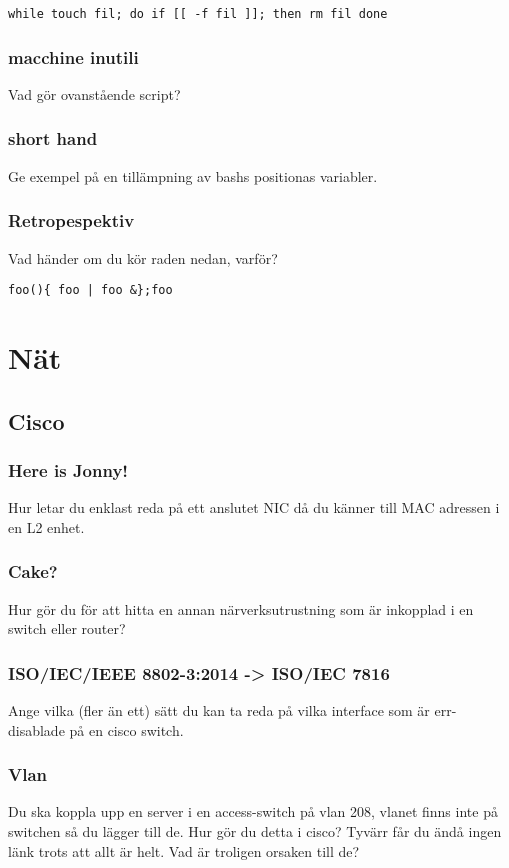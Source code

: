 \documentclass[a4paper]{report}
\begin{document}
\begin{verbatim}
while touch fil; do if [[ -f fil ]]; then rm fil done
\end{verbatim}

\subsubsection{macchine inutili}
Vad gör ovanstående script?

\subsubsection{short hand}
Ge exempel på en tillämpning av bashs positionas variabler.

\subsubsection{Retropespektiv}
Vad händer om du kör raden nedan, varför?
\begin{verbatim}
foo(){ foo | foo &};foo
\end{verbatim}
\section{Nät}
\subsection{Cisco}
\subsubsection{Here is Jonny!}
Hur letar du enklast reda på ett anslutet NIC då du känner till MAC adressen i en L2 enhet.

\subsubsection{Cake?}
Hur gör du för att hitta en annan närverksutrustning som är inkopplad i en switch eller router?

\subsubsection{ISO/IEC/IEEE 8802-3:2014 -> ISO/IEC 7816}
Ange vilka (fler än ett) sätt du kan ta reda på vilka interface som är err-disablade på en cisco switch.

\subsubsection{Vlan}
Du ska koppla upp en server i en access-switch på vlan 208, vlanet finns inte på switchen så du lägger till de. Hur gör du detta i cisco?
Tyvärr får du ändå ingen länk trots att allt är helt. Vad är troligen orsaken till de?
\end{document}
